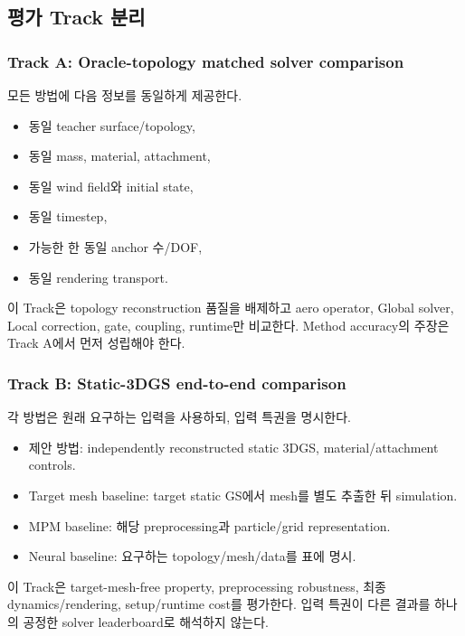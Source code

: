 \documentclass[11pt,a4paper]{article}
\begin{document}
\subsection{평가 Track 분리}

\subsubsection{Track A: Oracle-topology matched solver comparison}

모든 방법에 다음 정보를 동일하게 제공한다.

\begin{itemize}[leftmargin=1.5em]
  \item 동일 teacher surface/topology,
  \item 동일 mass, material, attachment,
  \item 동일 wind field와 initial state,
  \item 동일 timestep,
  \item 가능한 한 동일 anchor 수/DOF,
  \item 동일 rendering transport.
\end{itemize}

이 Track은 topology reconstruction 품질을 배제하고
aero operator, Global solver, Local correction, gate, coupling, runtime만 비교한다.
Method accuracy의 주장은 Track A에서 먼저 성립해야 한다.

\subsubsection{Track B: Static-3DGS end-to-end comparison}

각 방법은 원래 요구하는 입력을 사용하되, 입력 특권을 명시한다.

\begin{itemize}[leftmargin=1.5em]
  \item 제안 방법: independently reconstructed static 3DGS, material/attachment controls.
  \item Target mesh baseline: target static GS에서 mesh를 별도 추출한 뒤 simulation.
  \item MPM baseline: 해당 preprocessing과 particle/grid representation.
  \item Neural baseline: 요구하는 topology/mesh/data를 표에 명시.
\end{itemize}

이 Track은 target-mesh-free property, preprocessing robustness,
최종 dynamics/rendering, setup/runtime cost를 평가한다.
입력 특권이 다른 결과를 하나의 공정한 solver leaderboard로 해석하지 않는다.
\end{document}
